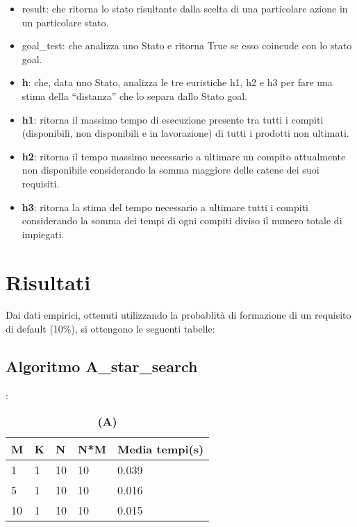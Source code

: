 \documentclass[]{article}
\begin{document}
\begin{itemize}
\begin{itemize}
				\item{result}: che ritorna lo stato risultante dalla scelta di una particolare azione in un
					particolare stato.
				\item{goal\_test}: che analizza uno Stato e ritorna True se esso coincude con lo stato goal.
				\item\textbf{{h}}: che, data uno Stato, analizza le tre euristiche h1, h2 e h3 per fare una stima della
					“distanza” che lo separa dallo Stato goal.
				\item{\textbf{h1}}: ritorna il massimo tempo di esecuzione presente tra tutti i compiti (disponibili,
					non disponibili e in lavorazione) di tutti i prodotti non ultimati.
				\item{\textbf{h2}}: ritorna il tempo massimo necessario a ultimare un compito attualmente non
					disponibile considerando la somma maggiore delle catene dei suoi requisiti.
				\item{\textbf{h3}}: ritorna la stima del tempo necessario a ultimare tutti i compiti considerando la somma dei tempi di ogni compiti diviso il numero totale di impiegati.
			\end{itemize}
		
		\section{Risultati}	
			Dai dati empirici, ottenuti utilizzando la probablità di formazione di un requisito di default (10\%), si ottengono le seguenti tabelle:
			
			\subsection{Algoritmo A\_star\_search}:
			
				\begin{table}
					\centering
					{
						\begin{tabular}{ |p{0.9cm}|p{0.9cm}|p{0.9cm}|p{0.9cm}|p{0.9cm}|  }
							\hline
							M& K & N & N*M & Media tempi(s)\\
							\hline
							1 & 1  & 10 & 10 & 0.039  \\
							5 & 1  & 10 & 10 & 0.016  \\
							10 & 1  & 10 & 10 & 0.015  \\
							\hline
						\end{tabular}
					}
				\caption{\textbf{(A)}}
				\end{table}
				

\end{itemize}
\end{document}
